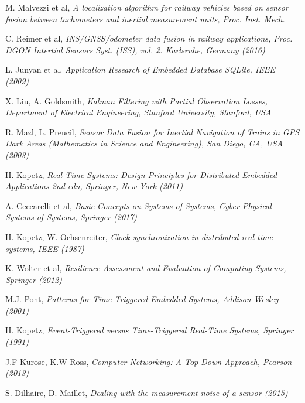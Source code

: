 \begin{thebibliography}{9}
M. Malvezzi et al, \textit{A localization algorithm for railway vehicles based on sensor fusion between tachometers and inertial measurement units, Proc. Inst. Mech.}

C. Reimer et al, \textit{INS/GNSS/odometer
data fusion in railway applications, Proc. DGON Intertial Sensors
Syst. (ISS), vol. 2. Karlsruhe, Germany (2016)} 

L. Junyan et al, \textit{Application Research of Embedded Database SQLite, IEEE (2009)}

X. Liu, A. Goldsmith, \textit{
Kalman  Filtering with Partial Observation Losses, Department of Electrical Engineering, Stanford University, Stanford, USA}

R. Mazl, L. Preucil, \textit{Sensor Data Fusion for Inertial Navigation of
Trains in GPS Dark Areas (Mathematics in Science and Engineering),
San Diego, CA, USA (2003)}

H. Kopetz, \textit{Real-Time Systems: Design Principles for Distributed Embedded Applications 2nd edn, Springer, New York (2011)}

A. Ceccarelli et al, \emph{Basic Concepts on Systems of Systems, Cyber-Physical Systems of Systems, Springer (2017)}

H. Kopetz, W. Ochsenreiter, \textit{Clock synchronization in distributed real-time systems, IEEE (1987)}

K. Wolter et al,
\textit{Resilience Assessment and Evaluation of Computing Systems, Springer (2012)}

M.J. Pont, \emph{Patterns for Time-Triggered Embedded Systems, Addison-Wesley (2001)}

H. Kopetz, \emph{Event-Triggered versus Time-Triggered Real-Time Systems, Springer (1991)}

J.F Kurose, K.W Ross, \emph{Computer Networking: A Top-Down Approach, Pearson (2013)}

S. Dilhaire, D. Maillet, \textit{Dealing  with the measurement noise of a sensor (2015)}

\end{thebibliography}